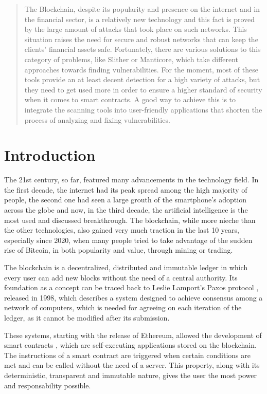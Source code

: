 \begin{abstract}
    The Blockchain, despite its popularity and presence on the internet and in the financial sector, is a relatively new technology and this fact is proved by the large amount of attacks that took place on such networks. This situation raises the need for secure and robust networks that can keep the clients’ financial assets safe. Fortunately, there are various solutions to this category of problems, like Slither or Manticore, which take different approaches towards finding vulnerabilities. For the moment, most of these tools provide an at least decent detection for a high variety of attacks, but they need to get used more in order to ensure a higher standard of security when it comes to smart contracts. A good way to achieve this is to integrate the scanning tools into user-friendly applications that shorten the process of analyzing and fixing vulnerabilities.
\end{abstract}

\chapter*{Introduction} 

The 21st century, so far, featured many advancements in the technology field. In the first decade, the internet had its peak spread among the high majority of people, the second one had seen a large grouth of the smartphone's adoption across the globe and now, in the third decade, the artificial intelligence is the most used and discussed breakthrough. The blockchain, while more nieche than the other technologies, also gained very much traction in the last 10 years, especially since 2020, when many people tried to take advantage of the sudden rise of Bitcoin, in both popularity and value, through mining or trading.

The blockchain is a decentralized, distributed and immutable ledger in which every user can add new blocks without the need of a central authority. Its foundation as a concept can be traced back to Leslie Lamport's Paxos protocol \cite{paxos}, released in 1998, which describes a system designed to achieve consensus among a network of computers, which is needed for agreeing on each iteration of the ledger, as it cannot be modified after its submission.

These systems, starting with the release of Ethereum, allowed the development of smart contracts \cite{smartContracts}, which are self-executing applications stored on the blockchain. The instructions of a smart contract are triggered when certain conditions are met and can be called without the need of a server. This property, along with its deterministic, transparent and immutable nature, gives the user the most power and responsability possible.

